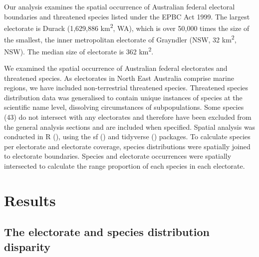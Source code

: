 \documentclass[a4paper,11pt]{article}
\begin{document}

Our analysis examines the spatial occurrence of Australian federal electoral boundaries and threatened species listed under the EPBC Act 1999. The largest electorate is Durack (1,629,886 km\textsuperscript{2}, WA), which is over 50,000 times the size of the smallest, the inner metropolitan electorate of Grayndler (NSW, 32 km\textsuperscript{2}, NSW). The median size of electorate is 362 km\textsuperscript{2}. 

We examined the spatial occurrence of Australian federal electorates and threatened species. As electorates in North East Australia comprise marine regions, we have included non-terrestrial threatened species. Threatened species distribution data was generalised to contain unique instances of species at the scientific name level, dissolving circumstances of subpopulations. Some species (43) do not intersect with any electorates and therefore have been excluded from the general analysis sections and are included when specified. Spatial analysis was conducted in R (\cite{rcoreteamLanguageEnvironmentStatistical2021}), using the sf (\cite{pebesmaSimpleFeaturesStandardized2018}) and tidyverse (\cite{wickhamWelcomeTidyverse2019}) packages. To calculate species per electorate and electorate coverage, species distributions were spatially joined to electorate boundaries. Species and electorate occurrences were spatially intersected to calculate the range proportion of each species in each electorate.

\section{Results}

\subsection{The electorate and species distribution disparity} 

\end{document}
